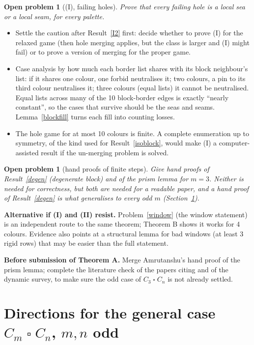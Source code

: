 \documentclass[11pt]{article}
\theoremstyle{plain}
\newtheorem{openprob}[theorem]{Open problem}
\theoremstyle{definition}
\theoremstyle{remark}
\newcommand{\T}{\mathbin{\square}}
\begin{document}
\begin{openprob}[(I), failing holes]\label{op1}
Prove that every failing hole is a local sea or a local seam, for every palette.
\end{openprob}
\begin{itemize}[itemsep=0.2em]
\item Settle the caution after Result~\ref{I2} first: decide whether to prove (I) for the relaxed game (then hole merging
applies, but the class is larger and (I) might fail) or to prove a version of merging for the proper game.
\item Case analysis by how much each border list shares with its block neighbour's list: if it shares one colour, one forbid
neutralises it; two colours, a pin to its third colour neutralises it; three colours (equal lists) it cannot be
neutralised. Equal lists across many of the 10 block-border edges is exactly ``nearly constant'', so the cases that survive
should be the seas and seams. Lemma~\ref{blockfill} turns each fill into counting losses.
\item The hole game for at most 10 colours is finite. A complete enumeration up to symmetry, of the kind used for
Result~\ref{isoblock}, would make (I) a computer-assisted result if the un-merging problem is solved.
\end{itemize}

\begin{openprob}[hand proofs of finite steps]\label{op3}
Give hand proofs of Result~\ref{degen} (degenerate block) and of the prism lemma for $m = 3$. Neither is needed for
correctness, but both are needed for a readable paper, and a hand proof of Result~\ref{degen} is what generalises to every
odd $m$ (Section~\ref{sec:directions}).
\end{openprob}

\textbf{Alternative if (I) and (II) resist.} Problem~\ref{window} (the window statement) is an independent route to the same
theorem; Theorem B shows it works for 4 colours. Evidence also points at a structural lemma for bad windows (at least 3
rigid rows) that may be easier than the full statement.

\textbf{Before submission of Theorem A.} Merge Amrutanshu's hand proof of the prism lemma; complete the literature check of
the papers citing \cite{LSPG} and of the dynamic survey, to make sure the odd case of $C_3 \T C_n$ is not already settled.

\section{Directions for the general case $C_m \T C_n$, $m, n$ odd}\label{sec:directions}
\end{document}
